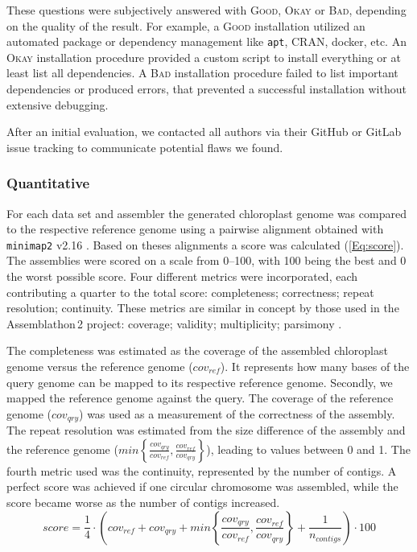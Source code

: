 \documentclass{bmcart}
\newcommand{\ok}{\textsc{Okay}}
\newcommand{\bad}{\textsc{Bad}}
\newcommand{\good}{\textsc{Good}}
\begin{document}
These questions were subjectively answered with \good{}, \ok{} or \bad{}, depending on the quality of the result. 
For example, a \good{} installation utilized an automated package or dependency management like \texttt{apt}, CRAN, docker, etc.
An \ok{} installation procedure provided a custom script to install everything or at least list all dependencies.
A \bad{} installation procedure failed to list important dependencies or produced errors, that prevented a successful installation without extensive debugging.

After an initial evaluation, we contacted all authors via their GitHub or GitLab issue tracking to communicate potential flaws we found.

\subsubsection*{Quantitative}
For each data set and assembler the generated chloroplast genome was compared to the respective reference genome using a pairwise alignment obtained with \texttt{minimap2} v2.16 \cite{li2018minimap2}. Based on theses alignments a score was calculated (\cref{Eq:score}).
The assemblies were scored on a scale from \numrange{0}{100}, with \num{100} being the best and \num{0} the worst possible score.
Four different metrics were incorporated, each contributing a quarter to the total score: completeness; correctness; repeat resolution; continuity.
These metrics are similar in concept by those used in the Assemblathon\,2 project: coverage; validity; multiplicity; parsimony \cite{assemblathon2}.

The completeness was estimated as the coverage of the assembled chloroplast genome versus the reference genome ($cov_{ref}$).
It represents how many bases of the query genome can be mapped to its respective reference genome.
Secondly, we mapped the reference genome against the query.
The coverage of the reference genome ($cov_{qry}$) was used as a measurement of the correctness of the assembly.
The repeat resolution was estimated from the size difference of the assembly and the reference genome ($min\left\{ \frac{cov_{qry}}{cov_{ref}}, \frac{cov_{ref}}{cov_{qry}}\right\}$), leading to values between \num{0} and \num{1}.
The fourth metric used was the continuity, represented by the number of contigs.
A perfect score was achieved if one circular chromosome was assembled, while the score became worse as the number of contigs increased.
\begin{equation}
   score = \frac{1}{4} \cdot \left( cov_{ref} +  cov_{qry} + min\left\{ \frac{cov_{qry}}{cov_{ref}}, \frac{cov_{ref}}{cov_{qry}}\right\} + \frac{1}{n_{contigs} }\right) \cdot 100 
   \label{Eq:score}
\end{equation}
\end{document}
